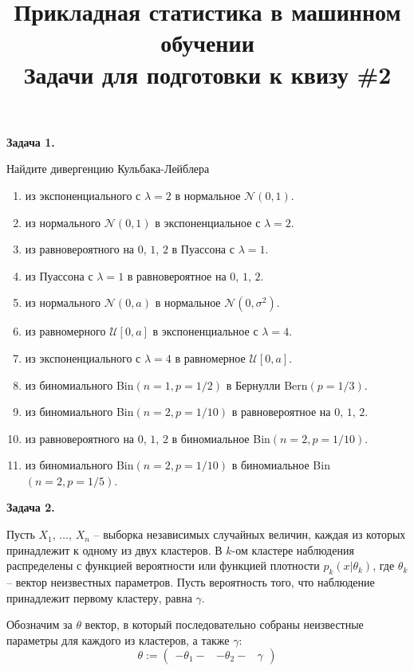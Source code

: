 \documentclass[10pt, a4paper]{extarticle}
\title{{\normalsize Прикладная статистика в машинном обучении} \\ \vspace{0.5em} Задачи для подготовки к квизу \#2}
\author{\rule{15cm}{0.4pt}}
\begin{document}
	
	\maketitle

	{\Large \textbf{Задача 1.}}
	
	Найдите дивергенцию Кульбака-Лейблера
	\begin{enumerate}[label = \alph*)]
		\item из экспоненциального с $\lambda = 2$ в нормальное $\mathcal{N}(0, 1)$.
		\item из нормального $\mathcal{N}(0, 1)$ в экспоненциальное с $\lambda = 2$.
		\item из равновероятного на $0$, $1$, $2$ в Пуассона с $\lambda = 1$.
		\item из Пуассона с $\lambda = 1$ в равновероятное на $0$, $1$, $2$.
		\item из нормального $\mathcal{N}(0, a)$ в нормальное $\mathcal{N}(0, \sigma^2)$.
		\item из равномерного $\mathcal{U}[0, a]$ в экспоненциальное с $\lambda = 4$.
		\item из экспоненциального с $\lambda = 4$ в равномерное $\mathcal{U}[0, a]$.
		\item из биномиального Bin$(n = 1, p = 1/2)$ в Бернулли Bern$(p = 1/3)$.
		\item из биномиального Bin$(n = 2, p = 1/10)$ в равновероятное на $0$, $1$, $2$.
		\item из равновероятного на $0$, $1$, $2$ в биномиальное Bin$(n = 2, p = 1/10)$.
		\item из биномиального Bin$(n = 2, p = 1/10)$ в биномиальное Bin$(n = 2, p = 1/5)$.
	\end{enumerate}

	\vspace{1em}

	{\Large \textbf{Задача 2.}}
	
	Пусть $X_1$, $\ldots$, $X_n$ -- выборка независимых случайных величин, каждая из которых принадлежит к одному из двух кластеров. В $k$-ом кластере наблюдения распределены с функцией вероятности или функцией плотности $p_k(x | \theta_k)$, где $\theta_k$ -- вектор неизвестных параметров. Пусть вероятность того, что наблюдение принадлежит первому кластеру, равна $\gamma$. 
	
	Обозначим за $\theta$ вектор, в который последовательно собраны неизвестные параметры для каждого из кластеров, а также $\gamma$:
	\[
	\theta := \begin{pmatrix}
		-\theta_1- & -\theta_2- & \gamma
	\end{pmatrix}
	\]
	
\end{document}
